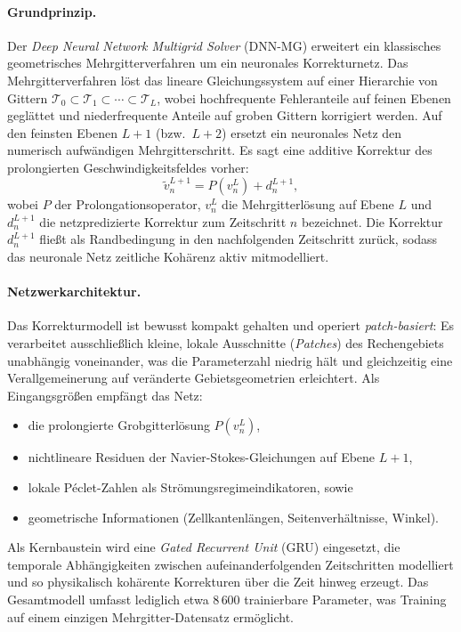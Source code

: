 \documentclass[a4paper,12pt]{article}
\begin{document}
\paragraph{Grundprinzip.}
Der \emph{Deep Neural Network Multigrid Solver} (DNN-MG) erweitert ein klassisches
geometrisches Mehrgitterverfahren um ein neuronales Korrekturnetz. Das
Mehrgitterverfahren löst das lineare Gleichungssystem auf einer Hierarchie von
Gittern $\mathcal{T}_0 \subset \mathcal{T}_1 \subset \cdots \subset \mathcal{T}_L$,
wobei hochfrequente Fehleranteile auf feinen Ebenen geglättet und
niederfrequente Anteile auf groben Gittern korrigiert werden.
Auf den feinsten Ebenen $L+1$ (bzw.\ $L+2$) ersetzt ein neuronales Netz
den numerisch aufwändigen Mehrgitterschritt. Es sagt eine additive Korrektur
des prolongierten Geschwindigkeitsfeldes vorher:
\begin{equation}
    \tilde{v}^{L+1}_n = P\!\left(v^L_n\right) + d^{L+1}_n,
    \label{eq:dnnmg}
\end{equation}
wobei $P$ der Prolongationsoperator, $v^L_n$ die Mehrgitterlösung auf Ebene
$L$ und $d^{L+1}_n$ die netzpredizierte Korrektur zum Zeitschritt $n$ bezeichnet.
Die Korrektur $d^{L+1}_n$ fließt als Randbedingung in den nachfolgenden
Zeitschritt zurück, sodass das neuronale Netz zeitliche Kohärenz aktiv
mitmodelliert.

\paragraph{Netzwerkarchitektur.}
Das Korrekturmodell ist bewusst kompakt gehalten und operiert \emph{patch-basiert}:
Es verarbeitet ausschließlich kleine, lokale Ausschnitte (\emph{Patches}) des
Rechengebiets unabhängig voneinander, was die Parameterzahl niedrig hält und
gleichzeitig eine Verallgemeinerung auf veränderte Gebietsgeometrien erleichtert.
Als Eingangsgrößen empfängt das Netz:
\begin{itemize}
    \item die prolongierte Grobgitterlösung $P(v^L_n)$,
    \item nichtlineare Residuen der Navier-Stokes-Gleichungen auf Ebene $L+1$,
    \item lokale Péclet-Zahlen als Strömungsregimeindikatoren, sowie
    \item geometrische Informationen (Zellkantenlängen, Seitenverhältnisse, Winkel).
\end{itemize}
Als Kernbaustein wird eine \emph{Gated Recurrent Unit} (GRU) eingesetzt,
die temporale Abhängigkeiten zwischen aufeinanderfolgenden Zeitschritten
modelliert und so physikalisch kohärente Korrekturen über die Zeit hinweg
erzeugt. Das Gesamtmodell umfasst lediglich etwa $8\,600$ trainierbare Parameter,
was Training auf einem einzigen Mehrgitter-Datensatz ermöglicht.
\end{document}
